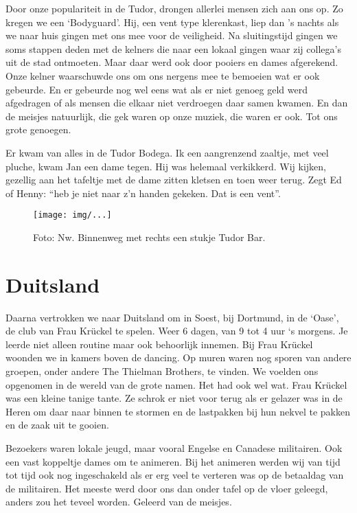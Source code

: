 \documentclass[10pt,twoside,openright]{memoir}
\begin{document}
Door onze populariteit in de Tudor, drongen allerlei mensen zich aan ons op. Zo kregen we een ‘Bodyguard’. Hij, een vent type klerenkast, liep dan ’s nachts als we naar huis gingen met ons mee voor de veiligheid. Na sluitingstijd gingen we soms stappen deden met de kelners die naar een lokaal gingen waar zij collega’s uit de stad ontmoeten. Maar daar werd ook door pooiers en dames afgerekend. Onze kelner waarschuwde ons om ons nergens mee te bemoeien wat er ook gebeurde. En er gebeurde nog wel eens wat als er niet genoeg geld werd afgedragen of als mensen die elkaar niet verdroegen daar samen kwamen. En dan de meisjes natuurlijk, die gek waren op onze muziek, die waren er ook. Tot ons grote genoegen. 

Er kwam van alles in de Tudor Bodega. Ik een aangrenzend zaaltje, met veel pluche, kwam Jan een dame tegen. Hij was helemaal verkikkerd. Wij kijken, gezellig aan het tafeltje met de dame zitten kletsen en toen weer terug. Zegt Ed of Henny: “heb je niet naar z’n handen gekeken. Dat is een vent”. 

\begin{figure}[t]
\texttt{[image: img/...]}
\caption{Foto: Nw. Binnenweg met rechts een stukje Tudor Bar.}
\end{figure}

\chapter{Duitsland} %
\label{cha:duitsland}

Daarna vertrokken we naar Duitsland om in Soest, bij Dortmund, in de ‘Oase’, de club van Frau Krückel te spelen. Weer 6 dagen, van 9 tot 4 uur ‘s morgens. Je leerde niet alleen routine maar ook behoorlijk innemen. Bij Frau Krückel woonden we in kamers boven de dancing. Op muren waren nog sporen van andere groepen, onder andere The Thielman Brothers, te vinden. We voelden ons opgenomen in de wereld van de grote namen. Het had ook wel wat. Frau Krückel was een kleine tanige tante. Ze schrok er niet voor terug als er gelazer was in de Heren om daar naar binnen te stormen en de lastpakken bij hun nekvel te pakken en de zaak uit te gooien.

Bezoekers waren lokale jeugd, maar vooral Engelse en Canadese militairen. Ook een vast koppeltje dames om te animeren. Bij het animeren werden wij van tijd tot tijd ook nog ingeschakeld als er erg veel te verteren was op de betaaldag van de militairen. Het meeste werd door ons dan onder tafel op de vloer geleegd, anders zou het teveel worden. Geleerd van de meisjes. 
\end{document}

